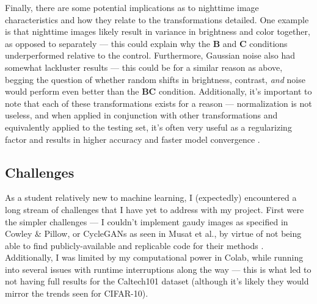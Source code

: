 \documentclass{article}
\begin{document}
Finally, there are some potential implications as to nighttime image characteristics and how they relate to the transformations detailed. One example is that nighttime images likely result in variance in brightness and color together, as opposed to separately --- this could explain why the \textbf{B} and \textbf{C} conditions underperformed relative to the control. Furthermore, Gaussian noise also had somewhat lackluster results --- this could be for a similar reason as above, begging the question of whether random shifts in brightness, contrast, \textit{and} noise would perform even better than the \textbf{BC} condition. Additionally, it's important to note that each of these transformations exists for a reason --- normalization is not useless, and when applied in conjunction with other transformations and equivalently applied to the testing set, it's often very useful as a regularizing factor and results in higher accuracy and faster model convergence \cite{schillingNorm}.

\subsection{Challenges}
As a student relatively new to machine learning, I (expectedly) encountered a long stream of challenges that I have yet to address with my project. First were the simpler challenges --- I couldn't implement gaudy images as specified in Cowley \& Pillow, or CycleGANs as seen in Musat et al., by virtue of not being able to find publicly-available and replicable code for their methods \cite{cowleyGaudy2020, multiweather2021}. Additionally, I was limited by my computational power in Colab, while running into several issues with runtime interruptions along the way --- this is what led to not having full results for the Caltech101 dataset (although it's likely they would mirror the trends seen for CIFAR-10). 
\end{document}
